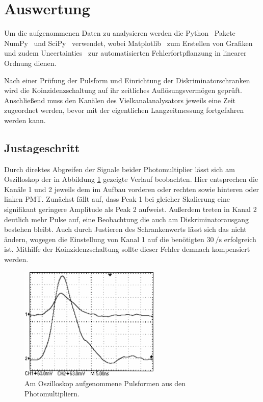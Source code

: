 \newpage
\section{Auswertung}

Um die aufgenommenen Daten zu analysieren werden die Python~\cite{python} Pakete NumPy~\cite{numpy} und SciPy~\cite{scipy} verwendet,
wobei Matplotlib~\cite{matplotlib} zum Erstellen von Grafiken und zudem Uncertainties~\cite{uncertainties} zur automatisierten
Fehlerfortpflanzung in linearer Ordnung dienen.

Nach einer Prüfung der Pulsform und Einrichtung der Diskriminatorschranken wird die Koinzidenzschaltung auf ihr zeitliches
Auflösungsvermögen geprüft. Anschließend muss den Kanälen des Vielkanalanalysators jeweils eine Zeit zugeordnet werden,
bevor mit der eigentlichen Langzeitmessung fortgefahren werden kann.



\subsection{Justageschritt}

Durch direktes Abgreifen der Signale beider Photomultiplier lässt sich am Oszilloskop der in Abbildung \ref{fig:pulse} gezeigte
Verlauf beobachten. Hier entsprechen die Kanäle 1 und 2 jeweils dem im Aufbau vorderen oder rechten sowie hinteren oder linken
PMT. Zunächst fällt auf, dass Peak 1 bei gleicher Skalierung eine signifikant geringere Amplitude als Peak 2
aufweist. Außerdem treten in Kanal 2 deutlich mehr Pulse auf, eine Beobachtung die auch am Diskriminatorausgang bestehen bleibt.
Auch durch Justieren des Schrankenwerts lässt sich das nicht ändern, wogegen die Einstellung von Kanal 1 auf die benötigten
$\qty{30}{\per\second}$ erfolgreich ist. Mithilfe der Koinzidenzschaltung sollte dieser Fehler demnach kompensiert werden.

\begin{figure}[H]
	\vspace{\baselineskip}
	\centering
	\includegraphics[width=0.6\textwidth]{content/messung/pulse.jpg}
	\caption{Am Oszilloskop aufgenommene Pulsformen aus den Photomultipliern.}
	\label{fig:pulse}
\end{figure}

